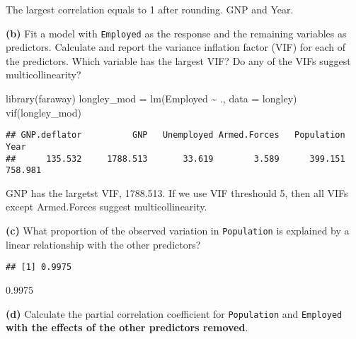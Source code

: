 \documentclass[
]{article}
\newenvironment{Shaded}{\begin{snugshade}}{\end{snugshade}}
\newcommand{\AttributeTok}[1]{\textcolor[rgb]{0.77,0.63,0.00}{#1}}
\newcommand{\FunctionTok}[1]{\textcolor[rgb]{0.00,0.00,0.00}{#1}}
\newcommand{\NormalTok}[1]{#1}
\newcommand{\OtherTok}[1]{\textcolor[rgb]{0.56,0.35,0.01}{#1}}
\newcommand{\SpecialCharTok}[1]{\textcolor[rgb]{0.00,0.00,0.00}{#1}}
\begin{document}
The largest correlation equals to 1 after rounding. GNP and Year.

\textbf{(b)} Fit a model with \texttt{Employed} as the response and the
remaining variables as predictors. Calculate and report the variance
inflation factor (VIF) for each of the predictors. Which variable has
the largest VIF? Do any of the VIFs suggest multicollinearity?

\begin{Shaded}
\begin{Highlighting}[]
\FunctionTok{library}\NormalTok{(faraway)}
\NormalTok{longley\_mod }\OtherTok{=} \FunctionTok{lm}\NormalTok{(Employed }\SpecialCharTok{\textasciitilde{}}\NormalTok{ ., }\AttributeTok{data =}\NormalTok{ longley)}
\FunctionTok{vif}\NormalTok{(longley\_mod)}
\end{Highlighting}
\end{Shaded}

\begin{verbatim}
## GNP.deflator          GNP   Unemployed Armed.Forces   Population         Year 
##      135.532     1788.513       33.619        3.589      399.151      758.981
\end{verbatim}

GNP has the largetst VIF, 1788.513. If we use VIF threshould 5, then all
VIFs except Armed.Forces suggest multicollinearity.

\textbf{(c)} What proportion of the observed variation in
\texttt{Population} is explained by a linear relationship with the other
predictors?

\begin{Shaded}
\end{Shaded}

\begin{verbatim}
## [1] 0.9975
\end{verbatim}

0.9975

\textbf{(d)} Calculate the partial correlation coefficient for
\texttt{Population} and \texttt{Employed} \textbf{with the effects of
the other predictors removed}.
\end{document}
